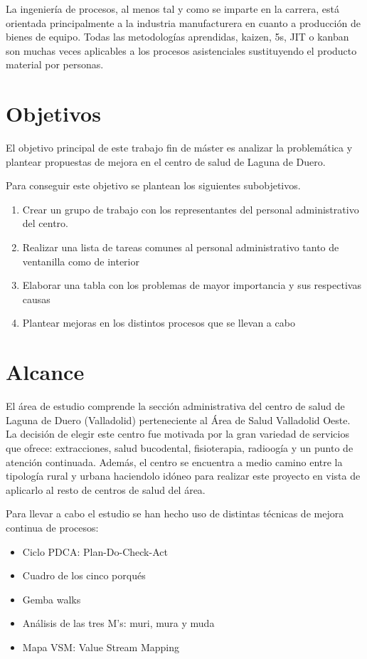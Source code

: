 La ingeniería de procesos, al menos tal y como se imparte en la carrera, está orientada principalmente a la industria manufacturera en cuanto a producción de bienes de equipo. Todas las metodologías aprendidas, kaizen, 5s, JIT o kanban son muchas veces aplicables a los procesos asistenciales sustituyendo el producto material por personas.

\section{Objetivos}

El objetivo principal de este trabajo fin de máster es analizar la problemática y plantear propuestas de mejora en el centro de salud de Laguna de Duero.

Para conseguir este objetivo se plantean los siguientes subobjetivos.
\begin{enumerate}
    \item Crear un grupo de trabajo con los representantes del personal administrativo del centro.
    \item Realizar una lista de tareas comunes al personal administrativo tanto de ventanilla como de interior
    \item Elaborar una tabla con los problemas de mayor importancia y sus respectivas causas
    \item Plantear mejoras en los distintos procesos que se llevan a cabo
\end{enumerate}

\section{Alcance}

El área de estudio comprende la sección administrativa del centro de salud de Laguna de Duero (Valladolid) perteneciente al Área de Salud Valladolid Oeste. La decisión de elegir este centro fue motivada por la gran variedad de servicios que ofrece: extracciones, salud bucodental, fisioterapia, radioogía y un punto de atención continuada. Además, el centro se encuentra a medio camino entre la tipología rural y urbana haciendolo idóneo para realizar este proyecto en vista de aplicarlo al resto de centros de salud del área.

Para llevar a cabo el estudio se han hecho uso de distintas técnicas de mejora continua de procesos:
\begin{itemize}
    \item Ciclo PDCA: Plan-Do-Check-Act
    \item Cuadro de los cinco porqués
    \item Gemba walks
    \item Análisis de las tres M's: muri, mura y muda
    \item Mapa VSM: Value Stream Mapping
\end{itemize}

